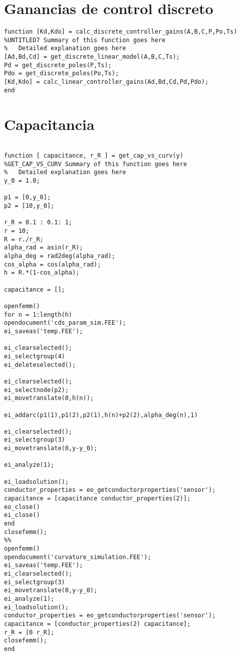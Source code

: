 \section{Ganancias de control  discreto}

\begin{lstlisting}[frame=single]
function [Kd,Kdo] = calc_discrete_controller_gains(A,B,C,P,Po,Ts)
%UNTITLED7 Summary of this function goes here
%   Detailed explanation goes here
[Ad,Bd,Cd] = get_discrete_linear_model(A,B,C,Ts);
Pd = get_discrete_poles(P,Ts);
Pdo = get_discrete_poles(Po,Ts);
[Kd,Kdo] = calc_linear_controller_gains(Ad,Bd,Cd,Pd,Pdo);
end

\end{lstlisting}

\section{Capacitancia}

\begin{lstlisting}[frame=single]

function [ capacitance, r_R ] = get_cap_vs_curv(y)
%GET_CAP_VS_CURV Summary of this function goes here
%   Detailed explanation goes here
y_0 = 1.0;

p1 = [0,y_0];
p2 = [10,y_0];

r_R = 0.1 : 0.1: 1;
r = 10;
R = r./r_R;
alpha_rad = asin(r_R);
alpha_deg = rad2deg(alpha_rad);
cos_alpha = cos(alpha_rad);
h = R.*(1-cos_alpha);

capacitance = [];

openfemm()
for n = 1:length(h)
opendocument('cds_param_sim.FEE');
ei_saveas('temp.FEE');

ei_clearselected();
ei_selectgroup(4)
ei_deleteselected();

ei_clearselected();
ei_selectnode(p2);
ei_movetranslate(0,h(n));

ei_addarc(p1(1),p1(2),p2(1),h(n)+p2(2),alpha_deg(n),1)

ei_clearselected();
ei_selectgroup(3)
ei_movetranslate(0,y-y_0);

ei_analyze(1);

ei_loadsolution();
conductor_properties = eo_getconductorproperties('sensor');
capacitance = [capacitance conductor_properties(2)];
eo_close()
ei_close()
end
closefemm();
%%
openfemm()
opendocument('curvature_simulation.FEE');
ei_saveas('temp.FEE');
ei_clearselected();
ei_selectgroup(3)
ei_movetranslate(0,y-y_0);
ei_analyze(1);
ei_loadsolution();
conductor_properties = eo_getconductorproperties('sensor');
capacitance = [conductor_properties(2) capacitance];
r_R = [0 r_R];
closefemm();
end
\end{lstlisting}

